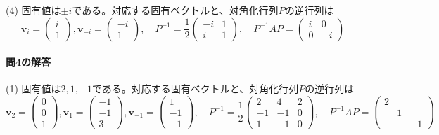\noindent (4) 固有値は$\pm i$である。対応する固有ベクトルと、対角化行列$P$の逆行列は
\[
\bm{v}_{i} = 
\begin{pmatrix}
i \\
1
\end{pmatrix}, 
\bm{v}_{-i} = 
\begin{pmatrix}
-i \\
1
\end{pmatrix}, \quad
P^{-1} = 
\frac{1}{2}
\begin{pmatrix}
-i & 1 \\
i & 1
\end{pmatrix}, \quad
P^{-1} AP =
\begin{pmatrix}
i & 0 \\
0 & -i
\end{pmatrix}
\]

\paragraph{問4の解答}
(1) 固有値は$2, 1, -1$である。対応する固有ベクトルと、対角化行列$P$の逆行列は
\[
\bm{v}_{2} = 
\begin{pmatrix}
0 \\
0 \\
1
\end{pmatrix}, 
\bm{v}_{1} = 
\begin{pmatrix}
-1 \\
-1 \\
3
\end{pmatrix}, 
\bm{v}_{-1} = 
\begin{pmatrix}
1 \\
-1 \\
-1
\end{pmatrix}, \quad
P^{-1} = 
\frac{1}{2}
\begin{pmatrix}
2 & 4 & 2 \\
-1 & -1 & 0 \\
1 & -1 & 0
\end{pmatrix}, \quad
P^{-1} AP =
\begin{pmatrix}
2 \\
 & 1 \\
 & & -1
\end{pmatrix}
\]

